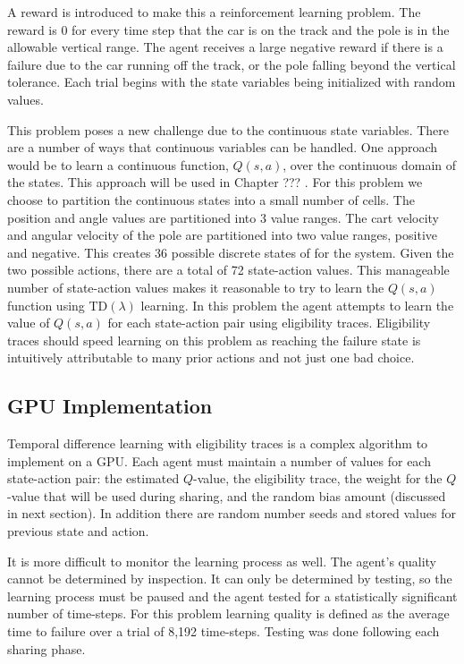 \begin{flushleft}

A reward is introduced to make this a reinforcement learning problem.  The reward is 0 for every time step that the car is on the track and the pole is in the allowable vertical range.  The agent receives a large negative reward if there is a failure due to the car running off the track, or the pole falling beyond the vertical tolerance.  Each trial begins with the state variables being initialized with random values.

This problem poses a new challenge due to the continuous state variables.  There are a number of ways that continuous variables can be handled.  One approach would be to learn a continuous function, $Q(s,a)$, over the continuous domain of the states.  This approach will be used in Chapter ??? .  For this problem we choose to partition the continuous states into a small number of cells.  The position and angle values are partitioned into 3 value ranges.  The cart velocity and angular velocity of the pole are partitioned into two value ranges, positive and negative.  This creates 36 possible discrete states of for the system.  Given the two possible actions, there are a total of 72 state-action values.  This manageable number of state-action values makes it reasonable to try to learn the $Q(s,a)$ function using TD$(\lambda)$ learning.  In this problem the agent attempts to learn the value of $Q(s,a)$ for each state-action pair using eligibility traces.  Eligibility traces should speed learning on this problem as reaching the failure state is intuitively attributable to many prior actions and not just one bad choice.

\subsection{GPU Implementation}
Temporal difference learning with eligibility traces is a complex algorithm to implement on a GPU.  Each agent must maintain a number of values for each state-action pair: the estimated $Q$-value, the eligibility trace, the weight for the $Q$-value that will be used during sharing, and the random bias amount (discussed in next section).   In addition there are random number seeds and stored values for previous state and action.

It is more difficult to monitor the learning process as well.  The agent’s quality cannot be determined by inspection.  It can only be determined by testing, so the learning process must be paused and the agent tested for a statistically significant number of time-steps.  For this problem learning quality is defined as the average time to failure over a trial of 8,192 time-steps.  Testing was done following each sharing phase. 


\end{flushleft}
